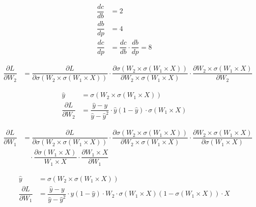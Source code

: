 \documentclass[12pt]{article}
\begin{document}
\begin{align*}
\dfrac{dc}{db} &= 2 \\
\dfrac{db}{dp} &= 4 \\
\dfrac{dc}{dp} &= \dfrac{dc}{db} \cdot \dfrac{db}{dp} = 8
\end{align*}


\begin{align*}
\dfrac{\partial L}{\partial W_2} &= \dfrac{\partial L}{\partial \sigma(W_2 \times \sigma(W_1 \times X))}
\cdot \dfrac{\partial \sigma(W_2 \times \sigma(W_1 \times X))}{\partial W_2 \times \sigma(W_1 \times X)}
\cdot \dfrac{\partial W_2 \times \sigma(W_1 \times X)}{\partial W_2}
\end{align*}

\begin{align*}
\hat y &= \sigma(W_2 \times \sigma(W_1 \times X)) \\[1em]
\dfrac{\partial L}{\partial W_2} &=
\dfrac{\hat y - y}{\hat y - \hat y^2}
\cdot \hat y (1 - \hat y)
\cdot \sigma(W_1 \times X)
\end{align*}


\begin{align*}
\dfrac{\partial L}{\partial W_1} &= \dfrac{\partial L}{\partial \sigma(W_2 \times \sigma(W_1 \times X))}
\cdot \dfrac{\partial \sigma(W_2 \times \sigma(W_1 \times X))}{\partial W_2 \times \sigma(W_1 \times X)}
\cdot \dfrac{\partial W_2 \times \sigma(W_1 \times X)}{\partial \sigma(W_1 \times X)}\\[1em]
&\quad \cdot \dfrac{\partial \sigma(W_1 \times X)}{W_1 \times X}
\cdot \dfrac{\partial W_1 \times X}{\partial W_1}
\end{align*}

\begin{align*}
\hat y &= \sigma(W_2 \times \sigma(W_1 \times X)) \\[1em]
\dfrac{\partial L}{\partial W_1} &=
\dfrac{\hat y - y}{\hat y - \hat y^2}
\cdot \hat y (1 - \hat y)
\cdot W_2
\cdot \sigma(W_1 \times X)(1 - \sigma(W_1 \times X))
\cdot X
\end{align*}
\end{document}
